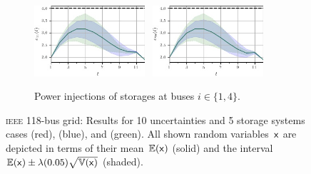 \documentclass[final,3p,times,twocolumn]{elsarticle}  %
\begin{document}
\begin{figure}
    \begin{subfigure}[c]{\figwidth}
    \centering
    	\includegraphics[width=0.45\textwidth]{figures/time series/case118_volatile/storage_e_4651.jpg}~
    	\includegraphics[width=0.45\textwidth]{figures/time series/case118_volatile/storage_e_4654.jpg}%
    	\vspace{-2mm}	
    	\caption{Power injections of storages at buses $i \in \{1,4\}$.}
    \end{subfigure}
    
    
    
    \vspace{2mm}	
	\vspace{\adjustlength}
	\caption{\textsc{ieee} 118-bus grid: Results for 10 uncertainties and 5 storage systems cases \caseNoStorage (red), \caseStorage (blue), and \caseStorageWithVariance (green). All shown random variables~$\mathsf{x}$ are depicted in terms of their mean~$\mathbb{E}(\mathsf{x})$ (solid) and the interval $\mathbb{E}(\mathsf{x}) \pm \lambda (0.05) \sqrt{\mathbb{V}(\mathsf{x})}$ (shaded).}
\end{figure}
\end{document}
